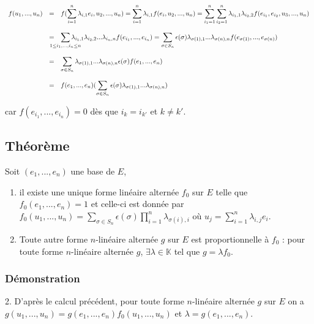 \documentclass[a4paper,10pt]{book} %
\newcommand{\K}{\mathbb{K}}
\newcommand{\displayAmath}{\displaystyle}
\begin{document}
$\displayAmath \begin{array}{rcl}
f(u_1,...,u_n)
&=&\displayAmath f(\sum_{i=1}^n\lambda_{i,1}e_i,u_2,...,u_n)=\sum_{i=1}^n\lambda_{i,1}f(e_{i},u_2,...,u_n)=\sum_{i_1=1}^n\sum_{i_2=1}^n\lambda_{i_1,1}\lambda_{i_2,2}f(e_{i_1},e_{i_2},u_3,...,u_n)\\\\
&=&\displayAmath \sum_{\mathclap{1\leq i_1,...,i_n\leq n}} \lambda_{i_1,1}\lambda_{i_2,2}...\lambda_{i_n,n}f(e_{i_1},...,e_{i_n})= \sum_{\sigma\in S_n}\epsilon(\sigma)\lambda_{\sigma(1),1}...\lambda_{\sigma(n),n} f(e_{\sigma(1)},...,e_{\sigma(n)})\\\\
&=& \displayAmath\sum_{\sigma\in S_n}\lambda_{\sigma(1),1} ... \lambda_{\sigma(n),n}\epsilon(\sigma)f(e_1,...,e_n)\\\\
&=& \displayAmath f(e_1,...,e_n)(\sum_{\sigma\in S_n} \epsilon(\sigma)\lambda_{\sigma(1),1}...\lambda_{\sigma(n),n})
\end{array}$

car $f(e_{i_1},...,e_{i_n})=0$ dès que $i_k=i_{k'}$ et $k\neq k'$.

\subsection{Théorème}
Soit $(e_1,...,e_n)$ une base de $E$,
\begin{enumerate}
\item  il existe une unique forme linéaire alternée $f_0$ sur $E$ telle que $f_0(e_1,...,e_n)=1$ et celle-ci est donnée par $\displayAmath f_0(u_1,...,u_n)=\sum_{\sigma\in S_n}\epsilon(\sigma)\prod_{i=1}^n\lambda_{\sigma(i),i}$ où $\displayAmath u_j=\sum_{i=1}^n\lambda_{i,j}e_i$.

\item Toute autre forme $n$-linéaire alternée $g$ sur $E$ est proportionnelle à $f_0$ : pour toute forme $n$-linéaire alternée $g$, $\exists \lambda\in \K$ tel que $g=\lambda f_0$.
\end{enumerate}

\subsubsection{Démonstration}
2. D'après le calcul précédent, pour toute forme $n$-linéaire alternée $g$ sur $E$ on a\\
$g(u_1,...,u_n)=g(e_1,...,e_n)f_0(u_1,...,u_n)$ et $\lambda=g(e_1,...,e_n)$.
\end{document}
